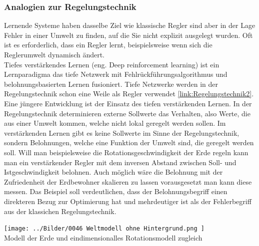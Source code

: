 \subsubsection{Analogien zur Regelungstechnik}
Lernende Systeme haben dasselbe Ziel wie klassische Regler sind aber in der Lage Fehler in einer Umwelt zu finden, auf die Sie nicht explizit ausgelegt wurden. Oft ist es erforderlich, dass ein Regler lernt, beispielsweise wenn sich die Reglerumwelt dynamisch ändert.\\
Tiefes verstärkendes Lernen (eng. Deep reinforcement learning) ist ein Lernparadigma das tiefe Netzwerk mit Fehlrückführungsalgorithmus und belohnungsbasierten Lernen fusioniert. Tiefe Netzwerke werden in der Regelungstechnik schon eine Weile als Regler verwendet \ref{link:Regelungstechnik2}. Eine jüngere Entwicklung ist der Einsatz des tiefen verstärkenden Lernen.
In der Regelungstechnik determinieren externe Sollwerte das Verhalten, also Werte, die aus einer Umwelt kommen, welche nicht lokal geregelt werden sollen. Im verstärkenden Lernen gibt es keine Sollwerte im Sinne der Regelungstechnik, sondern Belohnungen, welche eine Funktion der Umwelt sind, die geregelt werden soll. Will man beispielsweise die Rotationsgeschwindigkeit der Erde regeln kann man ein verstärkender Regler mit dem inversen Abstand zwischen Soll- und Istgeschwindigkeit belohnen. Auch möglich wäre die Belohnung mit der Zufriedenheit der Erdbewohner skalieren zu lassen vorausgesetzt man kann diese messen. Das Beispiel soll verdeutlichen, dass der Belohnungsbegriff einen direkteren Bezug zur Optimierung hat und mehrdeutiger ist als der Fehlerbegriff aus der klassichen Regelungstechnik.
\begin{center}
	\texttt{[image: ../Bilder/0046 Weltmodell ohne Hintergrund.png
	]}{\\Modell der Erde und eindimensionalles Rotationsmodell zugleich}
\end{center}


